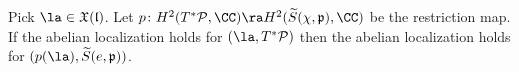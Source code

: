 \documentclass[12pt]{amsart}
\begin{document}
    \begin{prop}\label{loc_slodowy} Pick $\la \in \mathfrak{X}(\mathfrak{l})$. Let $p\colon H^2(T^*\mathcal{P},\CC) \ra H^2(\widetilde{S}(\chi,\mathfrak{p}),\CC)$ be the restriction map. If the abelian localization holds for $(\la,T^*\mathcal{P})$ then the abelian localization holds for $(p(\la),\widetilde{S}(e,\mathfrak{p}))$. 
	\end{prop}
    
   
    
\end{document}

